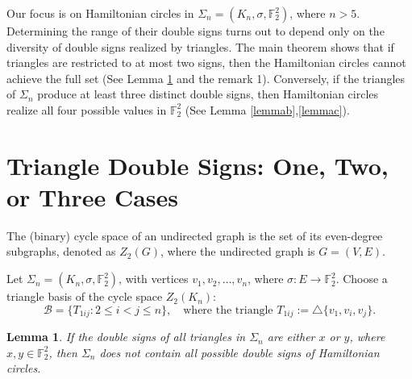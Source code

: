 \documentclass[12pt]{amsart}
\theoremstyle{plain}
\newtheorem{lemma}[theorem]{Lemma}
\theoremstyle{definition}%
\begin{document}
Our focus is on Hamiltonian circles in $\Sigma_n = (K_n,\sigma,\mathbb{F}_2^2)$, where $n>5$. Determining the range of their double signs turns out to depend only on the diversity of double signs realized by triangles. The main theorem shows that  if triangles are restricted to at most two signs, then the Hamiltonian circles cannot achieve the full set (See Lemma \ref{lemma22} and the remark 1). Conversely, if the triangles of $\Sigma_n$ produce at least three distinct double signs, then Hamiltonian circles realize all four possible values in $\mathbb{F}_2^2$ (See Lemma \ref{lemmab},\ref{lemmac}).




\section{Triangle Double Signs: One, Two, or Three Cases}



The (binary) cycle space  of an undirected graph is the set of its even-degree subgraphs, denoted as \(Z_2(G)\), where the undirected graph is \(G=(V,E)\).


Let \(\Sigma_n = (K_n, \sigma, \mathbb{F}_2^2)\), with vertices \(v_1, v_2, \ldots, v_n\), where \(\sigma \colon E \to \mathbb{F}_2^2\). Choose a triangle basis of the  cycle space \(Z_2(K_n)\):
\[
\mathcal{B} = \{ {T_{1ij}} : 2 \le i < j \le n \} , \quad \text{where the triangle } {T_{1ij}} := \triangle\{v_1, v_i, v_j\}.
\]





\begin{lemma}\label{lemma22}
If the double signs of all triangles in \(\Sigma_n\) are either \(x\) or \(y\), where \(x, y \in \mathbb{F}_2^2\), then \(\Sigma_n\) does not contain all possible double signs of Hamiltonian circles.
\end{lemma}
\end{document}
